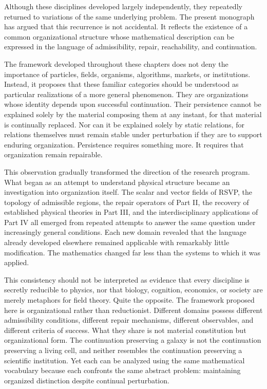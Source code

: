 \documentclass[11pt,oneside]{book}
\numberwithin{equation}{chapter}
\theoremstyle{definition}
\theoremstyle{plain}
\begin{document}
Although these disciplines developed largely independently, they
repeatedly returned to variations of the same underlying problem. The
present monograph has argued that this recurrence is not accidental. It
reflects the existence of a common organizational structure whose
mathematical description can be expressed in the language of
admissibility, repair, reachability, and continuation.

The framework developed throughout these chapters does not deny the
importance of particles, fields, organisms, algorithms, markets, or
institutions. Instead, it proposes that these familiar categories should be
understood as particular realizations of a more general phenomenon. They
are organizations whose identity depends upon successful continuation.
Their persistence cannot be explained solely by the material composing
them at any instant, for that material is continually replaced. Nor can it
be explained solely by static relations, for relations themselves must
remain stable under perturbation if they are to support enduring
organization. Persistence requires something more. It requires that
organization remain repairable.

This observation gradually transformed the direction of the research
program. What began as an attempt to understand physical structure became
an investigation into organization itself. The scalar and vector fields of
RSVP, the topology of admissible regions, the repair operators of Part II,
the recovery of established physical theories in Part III, and the
interdisciplinary applications of Part IV all emerged from repeated
attempts to answer the same question under increasingly general
conditions. Each new domain revealed that the language already developed
elsewhere remained applicable with remarkably little modification. The
mathematics changed far less than the systems to which it was applied.

This consistency should not be interpreted as evidence that every
discipline is secretly reducible to physics, nor that biology, cognition,
economics, or society are merely metaphors for field theory. Quite the
opposite. The framework proposed here is organizational rather than
reductionist. Different domains possess different admissibility
conditions, different repair mechanisms, different observables, and
different criteria of success. What they share is not material
constitution but organizational form. The continuation preserving a galaxy
is not the continuation preserving a living cell, and neither resembles
the continuation preserving a scientific institution. Yet each can be
analyzed using the same mathematical vocabulary because each confronts the
same abstract problem: maintaining organized distinction despite continual
perturbation.
\end{document}

